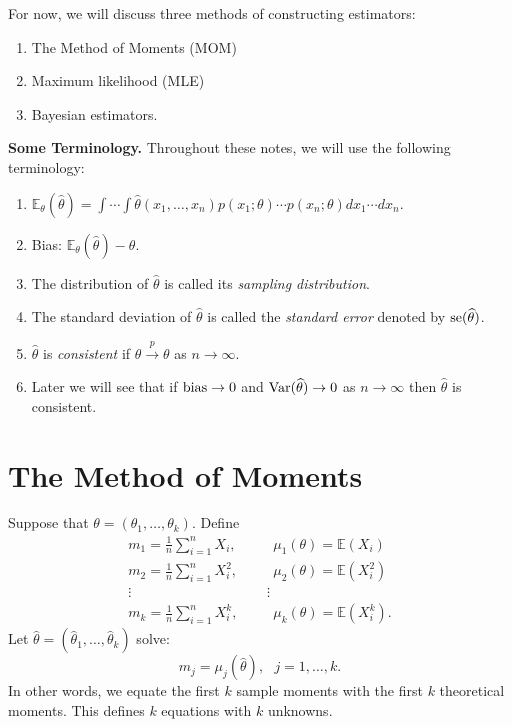 \documentclass[twoside,12pt]{article}
\newcommand{\cprob}{\overset{p}{\rightarrow}}
\begin{document}
For now, we will discuss three methods
of constructing estimators:
\begin{enumerate}
\item The Method of Moments (MOM)
\item Maximum likelihood (MLE)
\item Bayesian estimators.
\end{enumerate}



\textsf{\textbf{Some Terminology.}}
Throughout these notes, we will use the following terminology:

\begin{enumerate}
\item $\mathbb{E}_\theta(\widehat\theta) =
\int\cdots \int \widehat\theta(x_1,\ldots, x_n) p(x_1;\theta)\cdots p(x_n;\theta) dx_1 \cdots dx_n$.
\item Bias: $\mathbb{E}_\theta(\widehat\theta) - \theta$.
\item The distribution of $\widehat\theta$ is called its {\em sampling distribution}.
\item The standard deviation of $\widehat\theta$ is called the
{\em standard error} denoted by ${\rm se}(\widehat\theta)$.
\item $\widehat\theta$ is {\em consistent} if $\widehat\theta\cprob \theta$ as $n \rightarrow \infty$.
\item Later we will see that if
${\rm bias}\to 0$ and ${\rm Var}(\widehat\theta)\to 0$ as $n\to \infty$ then
$\widehat\theta$ is consistent.
\end{enumerate}

\section{The Method of Moments}

Suppose that
$\theta = (\theta_1,\ldots, \theta_k)$.
Define
\begin{eqnarray*}
m_1 = \frac{1}{n}\sum_{i=1}^n X_i , \ \ &&\ \ \mu_1(\theta) = \mathbb{E}(X_i)\\
m_2 = \frac{1}{n}\sum_{i=1}^n X_i^2 , \ \ &&\ \ \mu_2(\theta) = \mathbb{E}(X_i^2)\\
\vdots && \vdots\\
m_k = \frac{1}{n}\sum_{i=1}^n X_i^k , \ \ &&\ \ \mu_k(\theta) = \mathbb{E}(X_i^k).
\end{eqnarray*}
Let $\widehat\theta = (\widehat\theta_1,\ldots,\widehat\theta_k)$ solve:
$$
m_j = \mu_j(\widehat\theta),\ \ \ j=1,\ldots, k.
$$
In other words, we equate the first $k$ sample moments
with the first $k$ theoretical moments.
This defines $k$ equations with $k$ unknowns.
\end{document}
